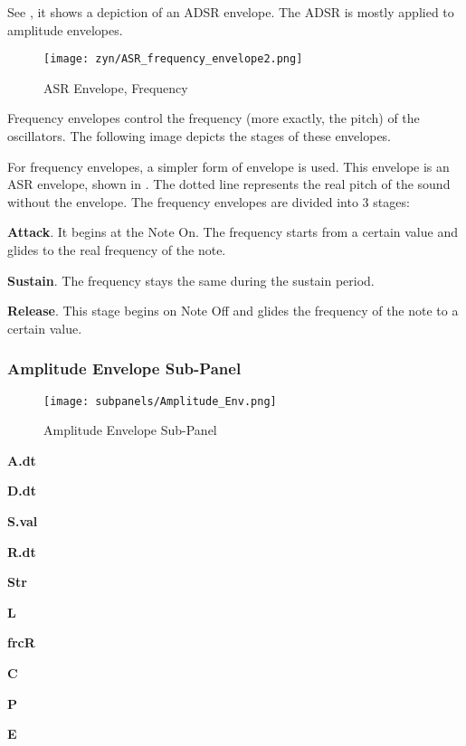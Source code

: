    See ,
   it shows a depiction of an ADSR envelope.
   The ADSR is mostly applied to amplitude envelopes.

\begin{figure}[H]
   \centering 
   \texttt{[image: zyn/ASR\_frequency\_envelope2.png]}
   \caption{ASR Envelope, Frequency}
   \label{fig:asr_envelope_depiction}
\end{figure}

   Frequency envelopes control the frequency (more exactly, the pitch) of the
   oscillators. The following image depicts the stages of these envelopes.

   For frequency envelopes, a simpler form of envelope is used.
   This envelope is an ASR envelope, shown in
   .
   The dotted line represents the real pitch of the sound without the envelope.
   The frequency envelopes are divided into 3 stages:

   \begin{enumber}
      \item \textbf{Attack}. 
      It begins at the Note On. The frequency starts from a certain value and
      glides to the real frequency of the note.
      \item \textbf{Sustain}.
      The frequency stays the same during the sustain period.
      \item \textbf{Release}.
      This stage begins on Note Off and glides the frequency of the note to a
      certain value.
   \end{enumber}

\subsubsection{Amplitude Envelope Sub-Panel}
\label{subsubsec:amplitude_envelope_subpanel}

\begin{figure}[H]
   \centering 
   \texttt{[image: subpanels/Amplitude\_Env.png]}
   \caption[Amplitude Envelope Sub-Panel]{Amplitude Envelope Sub-Panel}
   \label{fig:amplitude_env}
\end{figure}

   \begin{enumber}
      \item \textbf{A.dt}
      \item \textbf{D.dt}
      \item \textbf{S.val}
      \item \textbf{R.dt}
      \item \textbf{Str}
      \item \textbf{L}
      \item \textbf{frcR}
      \item \textbf{C}
      \item \textbf{P}
      \item \textbf{E}
   \end{enumber}

